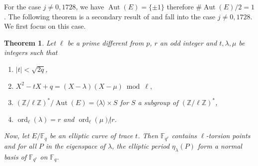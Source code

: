 \documentclass[12pt]{article}
\theoremstyle{plain}
\newtheorem{theorem}{Theorem}
\theoremstyle{definition}
\DeclareMathOperator{\order}{ord} %
\DeclareMathOperator{\Aut}{Aut}
\def\Z{\ensuremath{\mathbb{Z}}}
\def\F{\ensuremath{\mathbb{F}}}
\begin{document}
For the case $j\neq0,1728$, we have $\Aut(E)=\lbrace{\pm1}\rbrace$ therefore
$\#\Aut(E)/2 = 1$. The following theorem is a secondary result of
\cite{MiMoScho} and fall into the case $j\neq0,1728$. We first focus on
this case.

\begin{theorem}
\label{theorem:ellperiods}
Let $\ell$ be a prime different from $p$, $r$ an odd integer and $t, \lambda,
\mu$ be integers such that 
\begin{enumerate}
    \item $\mid t\mid < \sqrt{2q}$,
    \item $X^2 - tX + q = (X - \lambda)(X - \mu)\bmod \ell,$
    \item $(\Z/\ell\Z)^{\ast}/\Aut(E) = \langle{\lambda}\rangle \times S$ for $S$ a subgroup of
$(\Z/\ell\Z)^{\ast}$,
    \item $\order_\ell(\lambda) = r$ and $\order_\ell(\mu)\not|r$.
\end{enumerate}
Now, let $E/\F_q$ be an elliptic curve of trace $t$. Then $\F_{q^r}$ contains 
$\ell$-torsion points and for all $P$ in the eigenspace of $\lambda$, the elliptic 
period $\eta_\lambda(P)$ form a normal basis of $\F_{q^r}$ on $\F_q$.
\end{theorem}
\end{document}

